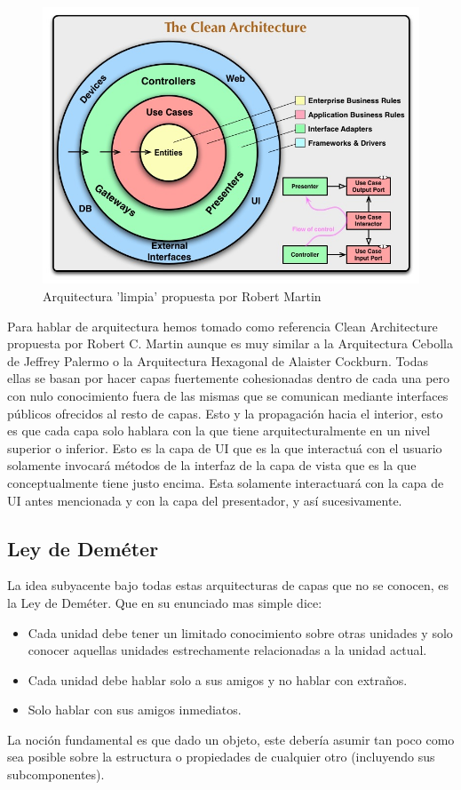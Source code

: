 \documentclass[../pfc.tex]{subfiles}
\begin{document}
	
		\begin{figure}[h]
			\centering
			\includegraphics[width=0.8\linewidth]{../images/CleanArchitecture}
			\caption{Arquitectura 'limpia' propuesta por Robert Martin}
			\label{fig:cleanarch}
		\end{figure}
	
	Para hablar de arquitectura hemos tomado como referencia Clean Architecture\cite{cleanarch} propuesta por Robert C. Martin aunque es muy similar a la Arquitectura Cebolla de Jeffrey Palermo\cite{onion} o la Arquitectura Hexagonal de Alaister Cockburn\cite{onion}. Todas ellas se basan por hacer capas fuertemente cohesionadas dentro de cada una pero con nulo conocimiento fuera de las mismas que se comunican mediante interfaces públicos ofrecidos al resto de capas. Esto y la propagación hacia el interior, esto es que cada capa solo hablara con la que tiene arquitecturalmente en un nivel superior o inferior. Esto es la capa de UI que es la que interactuá con el usuario solamente invocará métodos de la interfaz de la capa de vista que es la que conceptualmente tiene justo encima. Esta solamente interactuará con la capa de UI antes mencionada y con la capa del presentador, y así sucesivamente. \\
	
	\subsection{Ley de Deméter}
	
	La idea subyacente bajo todas estas arquitecturas de capas que no se conocen, es la Ley de Deméter. Que en su enunciado mas simple dice:
		\begin{itemize} 
			\item Cada unidad debe tener un limitado conocimiento sobre otras unidades y solo conocer aquellas unidades estrechamente relacionadas a la unidad actual.
			\item Cada unidad debe hablar solo a sus amigos y no hablar con extraños.
			\item Solo hablar con sus amigos inmediatos.
		\end{itemize}
	La noción fundamental es que dado un objeto, este debería asumir tan poco como sea posible sobre la estructura o propiedades de cualquier otro (incluyendo sus subcomponentes).\\
	
\end{document}
